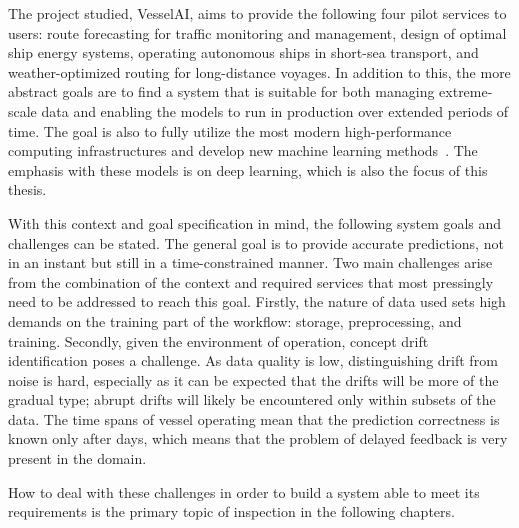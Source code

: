 The project studied, VesselAI, aims to provide the following four pilot services to users: route forecasting for traffic monitoring and management, design of optimal ship energy systems, operating autonomous ships in short-sea transport, and weather-optimized routing for long-distance voyages. In addition to this, the more abstract goals are to find a system that is suitable for both managing extreme-scale data and enabling the models to run in production over extended periods of time. The goal is also to fully utilize the most modern high-performance computing infrastructures and develop new machine learning methods~\cite{D1.1}. The emphasis with these models is on deep learning, which is also the focus of this thesis.

With this context and goal specification in mind, the following system goals and challenges can be stated. The general goal is to provide accurate predictions, not in an instant but still in a time-constrained manner. Two main challenges arise from the combination of the context and required services that most pressingly need to be addressed to reach this goal. Firstly, the nature of data used sets high demands on the training part of the workflow: storage, preprocessing, and training. Secondly, given the environment of operation, concept drift identification poses a challenge. As data quality is low, distinguishing drift from noise is hard, especially as it can be expected that the drifts will be more of the gradual type; abrupt drifts will likely be encountered only within subsets of the data. The time spans of vessel operating mean that the prediction correctness is known only after days, which means that the problem of delayed feedback is very present in the domain.

How to deal with these challenges in order to build a system able to meet its requirements is the primary topic of inspection in the following chapters.





